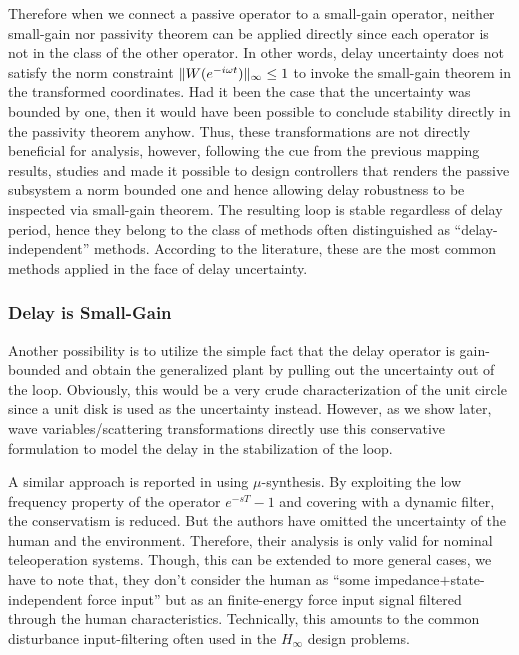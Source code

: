 Therefore when we connect a passive operator to a small-gain operator, neither small-gain nor passivity theorem
can be applied directly since each operator is not in the class of the other operator. In other words, delay 
uncertainty does not satisfy the norm constraint $\|W(e^{-i\omega t})\|_\infty \leq 1$ to invoke the small-gain 
theorem in the transformed coordinates. Had it been the case that the uncertainty was bounded by one, then it 
would have been possible to conclude stability directly in the passivity theorem anyhow. Thus, these transformations 
are not directly beneficial for analysis, however, following the cue from the previous mapping results, studies 
\cite{andersonspong} and \cite{nieslotine} made it possible to design controllers that renders the passive subsystem 
a norm bounded one and hence allowing delay robustness to be inspected via small-gain theorem. The resulting 
loop is stable regardless of delay period, hence they belong to the class of methods often distinguished
as \enquote{delay-independent} methods. According to the literature, these are the most common methods
applied in the face of delay uncertainty.

\subsubsection{Delay is Small-Gain}
Another possibility is to utilize the simple fact that the delay operator is gain-bounded and obtain the 
generalized plant by pulling out the uncertainty out of the loop. Obviously, this would be a very crude
characterization of the unit circle since a unit disk is used as the uncertainty instead. However, as 
we show later, wave variables/scattering transformations directly use this conservative formulation to 
model the delay in the stabilization of the loop.

A similar approach is reported in \cite{leungfa} using $\mu$-synthesis. By exploiting the
low frequency property of the operator $e^{-sT}-1$ and covering with a dynamic filter, the conservatism
is reduced. But the authors have omitted the uncertainty of the human and the environment. Therefore, 
their analysis is only valid for nominal teleoperation systems. Though, this can be extended to more 
general cases, we have to note that, they don't consider the human as \enquote{some impedance$+$state-independent 
force input} but as an finite-energy force input signal filtered through the human characteristics. 
Technically, this amounts to the common disturbance input-filtering often used in the $H_\infty$ design problems. 

